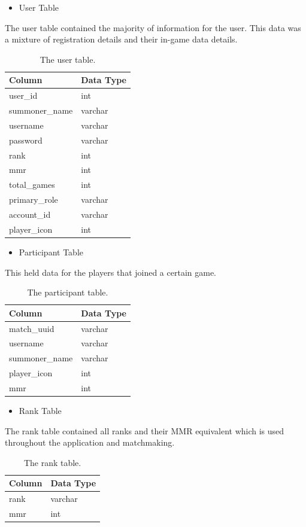 \begin{itemize}
	\item User Table
\end{itemize}
The user table contained the majority of information for the user. This data was a mixture of registration details and their in-game data details.
\begin{table}[h]
	\centering
	\begin{tabular}{ll}
		\toprule
		Column         & Data Type \\
		\midrule
		user\_id       & int       \\
		summoner\_name & varchar   \\
		username       & varchar   \\
		password       & varchar   \\
		rank           & int       \\
		mmr            & int       \\
		total\_games   & int       \\
		primary\_role  & varchar   \\
		account\_id    & varchar   \\
		player\_icon   & int   \\ 
		\bottomrule  
	\end{tabular}
\caption{The user table.}
\end{table}

\begin{itemize}
	\item Participant Table
\end{itemize}
This held data for the players that joined a certain game.
\begin{table}[h]
	\centering
	\begin{tabular}{ll}
		\toprule
		Column         & Data Type \\
		\midrule
		match\_uuid    & varchar   \\
		username       & varchar   \\
		summoner\_name & varchar   \\
		player\_icon   & int       \\
		mmr            & int   \\
		\bottomrule    
	\end{tabular}
\caption{The participant table.}
\end{table}

\newpage
\begin{itemize}
	\item Rank Table
\end{itemize}
The rank table contained all ranks and their MMR equivalent which is used throughout the application and matchmaking.
\begin{table}[h]
	\centering
	\begin{tabular}{ll}
		\toprule
		Column         & Data Type \\
		\midrule
		rank   & varchar   \\
		mmr    & int    \\
		\bottomrule    
	\end{tabular}
	\caption{The rank table.}
\end{table}

